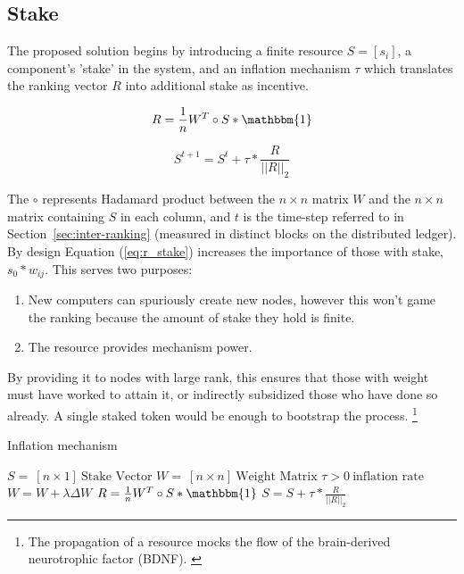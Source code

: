 \documentclass{article}
\begin{document}
\subsection{Stake}
\label{sec:stake}
The proposed solution begins by introducing a finite resource $ S=[s_i]$, a component's 'stake' in the system, and an inflation mechanism $\tau$ which translates the ranking vector $R$ into additional stake as incentive. 

\begin{equation}
\label{eq:r_stake}
R = \frac{1}{n} W^T \circ S * \mathbbm{1}
\end{equation}

\begin{equation}
S^{t+1} = S^t + \tau * \frac{R}{||R||_2} 
\end{equation}

The $\circ$ represents Hadamard product between the $n \times n$ matrix $W$ and the $n \times n$ matrix containing $S$ in each column, and $t$ is the time-step referred to in Section~\ref{sec:inter-ranking} (measured in distinct blocks on the distributed ledger). By design Equation (\ref{eq:r_stake}) increases the importance of those with stake, $s_0 * w_{ij}$. This serves two purposes: 

\begin{enumerate}
	\item New computers can spuriously create new nodes, however this won't game the ranking because the amount of stake they hold is finite.
	\item The resource provides mechanism power.
\end{enumerate}

By providing it to nodes with large rank, this ensures that those with weight must have worked to attain it, or indirectly subsidized those who have done so already. A single staked token would be enough to bootstrap the process. \footnote{The propagation of a resource mocks the flow of the brain-derived neurotrophic factor (BDNF). \cite{Bathina1989neurotrophin}} 

\begin{algorithm}
	\caption{Inflation mechanism}
	\begin{algorithmic} 
		
		\REQUIRE $S = \ [n \times 1] \ \textrm{Stake Vector}$
		\REQUIRE $W = \ [n \times n] \ \textrm{Weight Matrix}$
		\REQUIRE $\tau > 0 \ \textrm{inflation rate}$
		\STATE $W = W + \lambda \Delta W$
		\STATE $R = \frac{1}{n} W^T \circ S * \mathbbm{1}$
		\STATE $S = S + \tau * \frac{R}{||R||_2}  $
		\ENDWHILE
	\end{algorithmic}
\end{algorithm}
\end{document}
